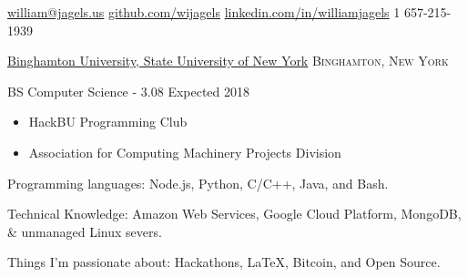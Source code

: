 \documentclass[11pt]{article}
\begin{document}
\sloppy  %



\nobreakvspace{0.3em}  %

\noindent\href{mailto:william@jagels.us}{william@jagels.us}\sbull
\href{https://github.com/wijagels}{github.com/wijagels}\sbull
\href{https://www.linkedin.com/in/williamjagels}{linkedin.com/in/williamjagels}\sbull
\textsmaller{+}1 657-215-1939



\spacedhrule{0.1em}{0.9em}  %

\headedsection
{\href{http://www.binghamton.edu/index.php}{Binghamton University, State University of New York}}
{\textsc{Binghamton, New York}} {
    \headedsubsection
    {BS Computer Science -  3.08}
    {Expected 2018}
    {	
        \begin{itemize}
            \item HackBU Programming Club
            \item Association for Computing Machinery Projects Division
        \end{itemize}
    }
}



\spacedhrule{0.1em}{0.9em}  %

\inlineheadsection  %
{Programming languages:}
{ Node.js, Python, C/C++, Java, and Bash.}


\inlineheadsection
{Technical Knowledge:}
{ Amazon Web Services, Google Cloud Platform, MongoDB, \& unmanaged Linux severs. }

\inlineheadsection
{Things I'm passionate about:}
{Hackathons, \LaTeX, Bitcoin, and Open Source.}


\vspace{0.5em}


\spacedhrule{0.1em}{0.9em}  %
\end{document}
